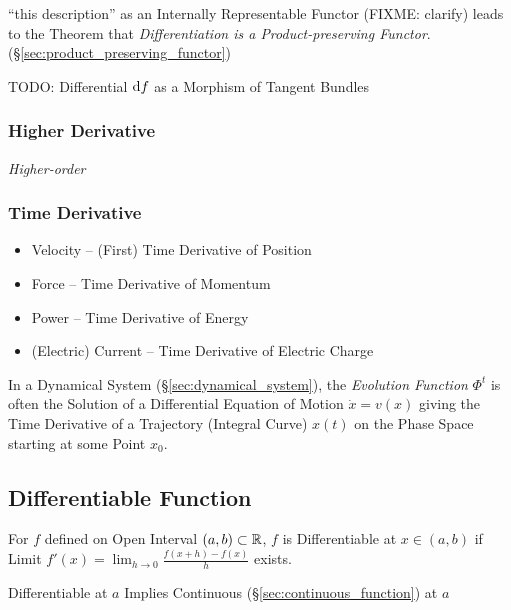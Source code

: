 ``this description'' as an Internally Representable Functor (FIXME: clarify)
leads to the Theorem that \emph{Differentiation is a Product-preserving
  Functor}. (\S\ref{sec:product_preserving_functor})

TODO: Differential $\mathrm{d}f$ as a Morphism of Tangent Bundles



\subsubsection{Higher Derivative}\label{sec:higher_derivative}

\emph{Higher-order}



\subsubsection{Time Derivative}\label{sec:time_derivative}

\begin{itemize}
  \item Velocity -- (First) Time Derivative of Position
  \item Force -- Time Derivative of Momentum
  \item Power -- Time Derivative of Energy
  \item (Electric) Current -- Time Derivative of Electric Charge
\end{itemize}

In a Dynamical System (\S\ref{sec:dynamical_system}), the \emph{Evolution
  Function} $\Phi^t$ is often the Solution of a Differential Equation of Motion
$\dot{x} = v(x)$ giving the Time Derivative of a Trajectory (Integral Curve)
$x(t)$ on the Phase Space starting at some Point $x_0$.



\subsection{Differentiable Function}\label{sec:differentiable_function}

For $f$ defined on Open Interval $(a,b) \subset \mathbb{R}$, $f$ is
Differentiable at $x \in (a,b)$ if Limit $f'(x) = \lim_{h \rightarrow
  0} \frac{f (x+h) - f(x)}{h}$ exists.

Differentiable at $a$ Implies Continuous (\S\ref{sec:continuous_function}) at
$a$

